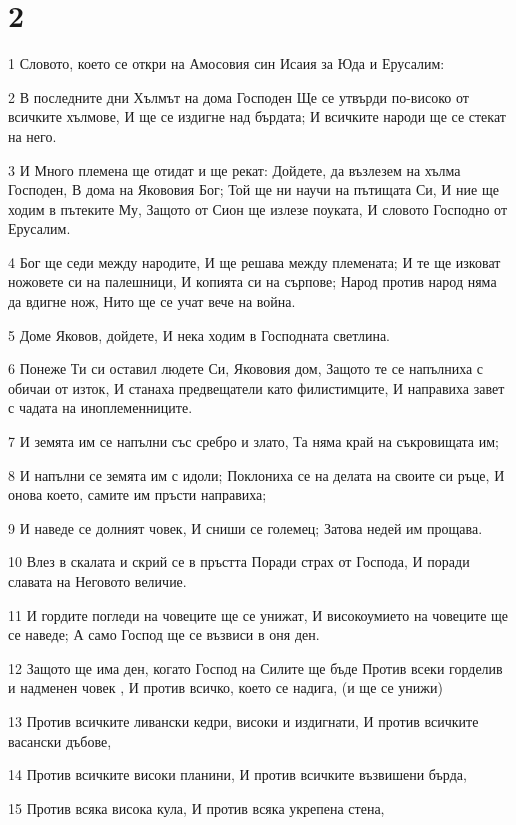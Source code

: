 \chapter{2}

\par 1 Словото, което се откри на Амосовия син Исаия за Юда и Ерусалим:
\par 2 В последните дни Хълмът на дома Господен Ще се утвърди по-високо от всичките хълмове, И ще се издигне над бърдата; И всичките народи ще се стекат на него.
\par 3 И Много племена ще отидат и ще рекат: Дойдете, да възлезем на хълма Господен, В дома на Якововия Бог; Той ще ни научи на пътищата Си, И ние ще ходим в пътеките Му, Защото от Сион ще излезе поуката, И словото Господно от Ерусалим.
\par 4 Бог ще седи между народите, И ще решава между племената; И те ще изковат ножовете си на палешници, И копията си на сърпове; Народ против народ няма да вдигне нож, Нито ще се учат вече на война.
\par 5 Доме Яковов, дойдете, И нека ходим в Господната светлина.
\par 6 Понеже Ти си оставил людете Си, Якововия дом, Защото те се напълниха с обичаи от изток, И станаха предвещатели като филистимците, И направиха завет с чадата на иноплеменниците.
\par 7 И земята им се напълни със сребро и злато, Та няма край на съкровищата им;
\par 8 И напълни се земята им с идоли; Поклониха се на делата на своите си ръце, И онова което, самите им пръсти направиха;
\par 9 И наведе се долният човек, И сниши се големец; Затова недей им прощава.
\par 10 Влез в скалата и скрий се в пръстта Поради страх от Господа, И поради славата на Неговото величие.
\par 11 И гордите погледи на човеците ще се унижат, И високоумието на човеците ще се наведе; А само Господ ще се възвиси в оня ден.
\par 12 Защото ще има ден, когато Господ на Силите ще бъде Против всеки горделив и надменен човек , И против всичко, което се надига, (и ще се унижи)
\par 13 Против всичките ливански кедри, високи и издигнати, И против всичките васански дъбове,
\par 14 Против всичките високи планини, И против всичките възвишени бърда,
\par 15 Против всяка висока кула, И против всяка укрепена стена,
